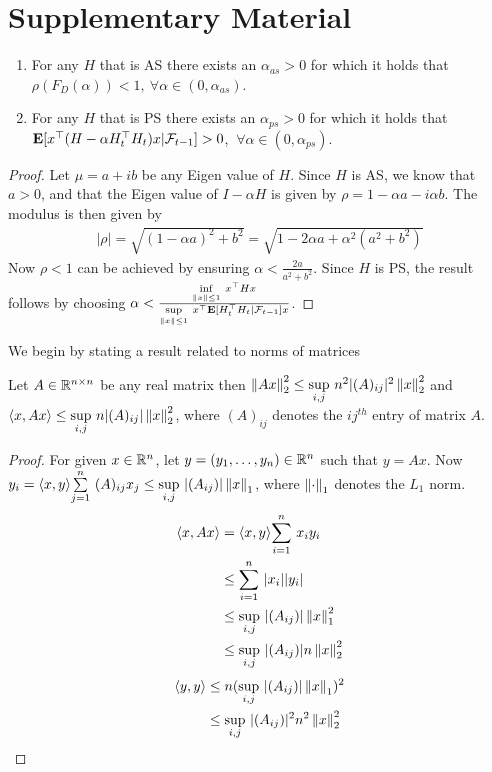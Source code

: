 \onecolumn
\section{Supplementary Material}
\begin{lemma}\label{addstep}
\begin{enumerate}[label=(\roman*)]
\item For any $H$ that is AS there exists an $\alpha_{as}>0$ for which it holds that $\rho(F_D(\alpha))<1,~\forall \alpha\in (0,\alpha_{as})$.
\item For any $H$ that is PS there exists an $\alpha_{ps}>0$ for which it holds that $\E[x^\top(H-\alpha H_t^\top H_t)x|\F_{t-1}]> 0$, $~\forall \alpha\in (0,\alpha_{ps})$.
\end{enumerate}
\end{lemma}
\begin{proof}
Let $\mu=a+i b$ be any Eigen value of $H$. Since $H$ is AS, we know that $a>0$, and that the Eigen value of $I-\alpha H$ is given by $\rho=1-\alpha a -i\alpha b$. The modulus is then given by
\begin{align*}
|\rho| =\sqrt{(1-\alpha a)^2+b^2}=\sqrt{1-2\alpha a +\alpha^2 (a^2+b^2)}
\end{align*}
Now $\rho<1$ can be achieved by ensuring $\alpha <\frac{2a}{a^2+b^2}$.
Since $H$ is PS, the result follows by choosing $\alpha<\frac{\us{\inf}{\norm{x}\leq 1} x^\top H x}{\us{\sup}{\norm{x}\leq 1}x^\top \E[H_t^\top H_t|\F_{t-1}]x}$.
\end{proof}


We begin by stating a result related to norms of matrices
\begin{lemma}
Let $A\in \R^{n\times n}$ be any real matrix then $\norm{Ax}^2_2\leq \us{\sup}{i,j}n^2|(A)_{ij}|^2\norm{x}^2_2$ and $\ip{x,Ax}\leq \us{\sup}{i,j}n|(A)_{ij}|\norm{x}^2_2$, where $(A)_{ij}$ denotes the $ij^{th}$ entry of matrix $A$.
\end{lemma}
\begin{proof}
For given $x\in \R^n$, let $y=(y_1,\ldots,y_n)\in \R^n$ such that $y=Ax$. Now $y_i=\ip{x,y}\ous{\sum}{j=1}{n} (A)_{ij}x_j\leq \us{\sup}{i,j}|(A_{ij})| \norm{x}_1$, where $\norm{\cdot}_1$ denotes the $L_1$ norm.
\begin{align*}
\ip{x,Ax}&=\ip{x,y}\ous{\sum}{i=1}{n} x_iy_i\\
&\leq\ous{\sum}{i=1}{n} |x_i||y_i|\\
&\leq \us{\sup}{i,j}|(A_{ij})| \norm{x}^2_1\\
&\leq \us{\sup}{i,j}|(A_{ij})| n\norm{x}^2_2
\end{align*}
\begin{align*}
\ip{y,y}&\leq n(\us{\sup}{i,j}|(A_{ij})| \norm{x}_1)^2\\
&\leq \us{\sup}{i,j}|(A_{ij})|^2 n^2 \norm{x}^2_2
\end{align*}
\end{proof}

